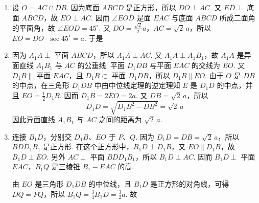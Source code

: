 \documentclass[UTF8,a4paper,oneside,11pt]{ctexbook}
\begin{document}
\begin{solution}
\begin{enumerate}
\item 设 \(O=AC\cap DB\). 因为底面 \(ABCD\) 是正方形，所以 \(DO\perp AC\). 又 \(ED\perp\) 底面 \(ABCD\)，故 \(EO\perp AC\). 因而 \(\angle EOD\) 是面 \(EAC\) 与底面 \(ABCD\) 所成二面角的平面角，故 \(\angle EOD=45^\circ\).
又 \(DO=\frac{\sqrt2}{2}a\)，\(AC=\sqrt2\,a\)，所以 \(EO=DO\cdot\sec45^\circ=a\). 于是

\item 因为 \(A_1A\perp\) 平面 \(ABCD\)，所以 \(A_1A\perp AC\). 又 \(A_1A\perp A_1B_1\)，故 \(A_1A\) 是异面直线 \(A_1B_1\) 与 \(AC\) 的公垂线.
平面 \(D_1DB\) 与平面 \(EAC\) 的交线为 \(EO\). 又 \(D_1B\parallel\) 平面 \(EAC\)，且 \(D_1B\subset\) 平面 \(D_1DB\)，所以 \(D_1B\parallel EO\). 由于 \(O\) 是 \(DB\) 的中点，在三角形 \(D_1DB\) 中由中位线定理的逆定理知 \(E\) 是 \(D_1D\) 的中点，并且 \(EO=\frac12D_1B\). 因而 \(D_1B=2EO=2a\). 又 \(DB=\sqrt2\,a\)，所以
\[
D_1D=\sqrt{D_1B^2-DB^2}=\sqrt2\,a
\]
因此异面直线 \(A_1B_1\) 与 \(AC\) 之间的距离为 \(\sqrt2\,a\).

\item 连接 \(B_1D\)，分别交 \(D_1B\)、\(EO\) 于 \(P\)、\(Q\). 因为 \(D_1D=DB=\sqrt2\,a\)，所以 \(BDD_1B_1\) 是正方形. 在这个正方形中，\(B_1D\perp D_1B\)，又 \(EO\parallel D_1B\)，故 \(B_1D\perp EO\). 另外 \(AC\perp\) 平面 \(BDD_1B_1\)，所以 \(B_1D\perp AC\). 因而 \(B_1D\perp\) 平面 \(EAC\)，\(B_1Q\) 是三棱锥 \(B_1-EAC\) 的高.

由 \(EO\) 是三角形 \(D_1DB\) 的中位线，且 \(B_1D\) 是正方形的对角线，可得 \(DQ=PQ\)，所以 \(B_1Q=\frac34 B_1D=\frac32 a\). 故
\end{enumerate}
\end{solution}
\end{document}
